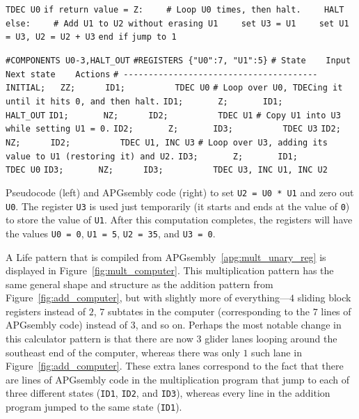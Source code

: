 \begin{apgsembly}
	\centering
	\begin{minipage}[t]{.49\textwidth}
		\begin{algorithmic}[1]\small
			\State\texttt{TDEC U0}
			\State\texttt{if return value = Z:}
			\State\texttt{~~~~\# Loop U0 times, then halt.}
			\State\texttt{~~~~HALT}
			\State\texttt{else:}
			\State\texttt{~~~~\# Add U1 to U2 without erasing U1}
			\State\texttt{~~~~set U3 = U1}
			\State\texttt{~~~~set U1 = U3, U2 = U2 + U3}
			\State\texttt{end if}
			\State\texttt{jump to 1}
		\end{algorithmic}
	\end{minipage}\hfill{\color{gray}\vline}\hfill
	\begin{minipage}[t]{.49\textwidth}
		\begin{algorithmic}\tiny
			\State \verb|#COMPONENTS U0-3,HALT_OUT|
			\State \verb|#REGISTERS {"U0":7, "U1":5}|
			\State \verb|# State    Input    Next state    Actions|
			\State \verb|# ---------------------------------------|
			\State \verb|INITIAL;   ZZ;      ID1;          TDEC U0|
			\State \verb||
			\State \verb|# Loop over U0, TDECing it until it hits 0, and then halt.|
			\State \verb|ID1;       Z;       ID1;          HALT_OUT|
			\State \verb|ID1;       NZ;      ID2;          TDEC U1|
			\State \verb||
			\State \verb|# Copy U1 into U3 while setting U1 = 0.|
			\State \verb|ID2;       Z;       ID3;          TDEC U3|
			\State \verb|ID2;       NZ;      ID2;          TDEC U1, INC U3|
			\State \verb||
			\State \verb|# Loop over U3, adding its value to U1 (restoring it) and U2.|
			\State \verb|ID3;       Z;       ID1;          TDEC U0|
			\State \verb|ID3;       NZ;      ID3;          TDEC U3, INC U1, INC U2|
		\end{algorithmic}
	\end{minipage}
	\caption{Pseudocode (left) and APGsembly code (right) to set \texttt{U2 = U0 * U1} and zero out \texttt{U0}. The register \texttt{U3} is used just temporarily (it starts and ends at the value of \texttt{0}) to store the value of \texttt{U1}. After this computation completes, the registers will have the values \texttt{U0 = 0}, \texttt{U1 = 5}, \texttt{U2 = 35}, and \texttt{U3 = 0}.}\label{apg:mult_unary_reg}
\end{apgsembly}

A Life pattern that is compiled from APGsembly~\ref{apg:mult_unary_reg} is displayed in Figure~\ref{fig:mult_computer}. This multiplication pattern has the same general shape and structure as the addition pattern from Figure~\ref{fig:add_computer}, but with slightly more of everything---$4$ sliding block registers instead of $2$, $7$ subtates in the computer (corresponding to the $7$ lines of APGsembly code) instead of $3$, and so on. Perhaps the most notable change in this calculator pattern is that there are now $3$ glider lanes looping around the southeast end of the computer, whereas there was only $1$ such lane in Figure~\ref{fig:add_computer}. These extra lanes correspond to the fact that there are lines of APGsembly code in the multiplication program that jump to each of three different states (\texttt{ID1}, \texttt{ID2}, and \texttt{ID3}), whereas every line in the addition program jumped to the same state (\texttt{ID1}).

